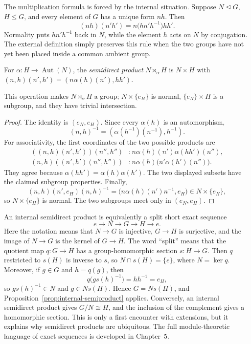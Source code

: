 The multiplication formula is forced by the internal situation.  Suppose
\(N\trianglelefteq G\), \(H\leq G\), and every element of \(G\) has a unique
form \(nh\).  Then
\[
 (nh)(n'h')=n\bigl(hn'h^{-1}\bigr)hh'.
\]
Normality puts \(hn'h^{-1}\) back in \(N\), while the element \(h\) acts on
\(N\) by conjugation.  The external definition simply preserves this rule
when the two groups have not yet been placed inside a common ambient group.

\begin{definition}
For \(\alpha:H\to\operatorname{Aut}(N)\), the \emph{semidirect product}
\(N\rtimes_\alpha H\) is \(N\times H\) with
\((n,h)(n',h')=(n\alpha(h)(n'),hh')\).
\end{definition}

\begin{proposition}
This operation makes \(N\rtimes_\alpha H\) a group; \(N\times\{e_H\}\) is
normal, \(\{e_N\}\times H\) is a subgroup, and they have trivial intersection.
\end{proposition}
\begin{proof}
The identity is \((e_N,e_H)\). Since every \(\alpha(h)\) is an automorphism,
\[(n,h)^{-1}=(\alpha(h^{-1})(n^{-1}),h^{-1}).\]
For associativity, the first coordinates of the two possible products are
\begin{align*}
 ((n,h)(n',h'))(n'',h'')&:
 n\alpha(h)(n')\alpha(hh')(n''),\\
 (n,h)((n',h')(n'',h''))&:
 n\alpha(h)\bigl(n'\alpha(h')(n'')\bigr).
\end{align*}
They agree because \(\alpha(hh')=\alpha(h)\alpha(h')\).  The two displayed subsets have the
claimed subgroup properties.  Finally,
\[
 (n,h)(n',e_H)(n,h)^{-1}=
 \bigl(n\alpha(h)(n')n^{-1},e_H\bigr)\in N\times\{e_H\},
\]
so \(N\times\{e_H\}\) is normal. The two subgroups meet only in
\((e_N,e_H)\).
\end{proof}

An internal semidirect product is equivalently a split short exact sequence
\[e\longrightarrow N\longrightarrow G\longrightarrow H\longrightarrow e.\]
Here the notation means that \(N\to G\) is injective, \(G\to H\) is
surjective, and the image of \(N\to G\) is the kernel of \(G\to H\).
The word ``split'' means that the quotient map \(q:G\to H\) has a
group-homomorphic
section \(s:H\to G\). Then \(q\) restricted to \(s(H)\) is inverse to \(s\),
so \(N\cap s(H)=\{e\}\), where \(N=\ker q\). Moreover, if \(g\in G\) and
\(h=q(g)\), then
\[
q\bigl(gs(h)^{-1}\bigr)=hh^{-1}=e_H,
\]
so \(gs(h)^{-1}\in N\) and \(g\in Ns(H)\). Hence \(G=Ns(H)\), and
Proposition~\ref{prop:internal-semiproduct} applies. Conversely, an internal
semidirect product gives \(G/N\cong H\), and the inclusion of the complement
gives a homomorphic section. This is only a first encounter with extensions,
but it explains why semidirect products are ubiquitous. The full
module-theoretic language of exact sequences is developed in Chapter~5.

